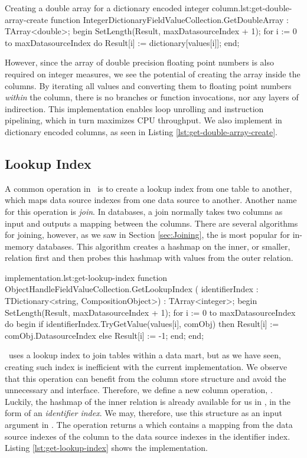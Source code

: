 \begin{delphicode}{Creating a double array for a dictionary encoded integer column.}{lst:get-double-array-create}
function IntegerDictionaryFieldValueCollection.GetDoubleArray
: TArray<double>;
begin
  SetLength(Result, maxDatasourceIndex + 1);
  for i := 0 to maxDatasourceIndex do
    Result[i] := dictionary[values[i]];
end;
\end{delphicode}
However, since the array of double precision floating point numbers is also required on integer measures, we see the potential of creating the array inside the columns. By iterating all values and converting them to floating point numbers \textit{within} the column, there is no branches or function invocations, nor any layers of indirection. This implementation enables loop unrolling and instruction pipelining, which in turn maximizes CPU throughput. We also implement  in dictionary encoded columns, as seen in Listing \ref{lst:get-double-array-create}.

\subsection{Lookup Index}
\label{sub:Lookup Index}
A common operation in \bd~is to create a lookup index from one table to another, which maps data source indexes from one data source to another. Another name for this operation is \textit{join}. In databases, a join normally takes two columns as input and outputs a mapping between the columns. There are several algorithms for joining, however, as we saw in Section \ref{sec:Joining}, the  is most popular for in-memory databases. This algorithm creates a hashmap on the inner, or smaller, relation first and then probes this hashmap with values from the outer relation.

\begin{delphicode}{ implementation.}{lst:get-lookup-index}
function ObjectHandleFieldValueCollection.GetLookupIndex
( identifierIndex : TDictionary<string, CompositionObject>)
: TArray<integer>;
begin
  SetLength(Result, maxDatasourceIndex + 1);
  for i := 0 to maxDatasourceIndex do
  begin
    if identifierIndex.TryGetValue(values[i], comObj) then
      Result[i] := comObj.DatasourceIndex
    else
      Result[i] := -1;
  end;
end;
\end{delphicode}
\gd~uses a lookup index to join tables within a data mart, but as we have seen, creating such index is inefficient with the current implementation. We observe that this operation can benefit from the column store structure and avoid the unnecessary  and  interface. Therefore, we define a new column operation, . Luckily, the hashmap of the inner relation is already available for us in \gap, in the form of an \textit{identifier index}. We may, therefore, use this structure as an input argument in . The operation returns a  which contains a mapping from the data source indexes of the column to the data source indexes in the identifier index. Listing \ref{lst:get-lookup-index} shows the implementation.


